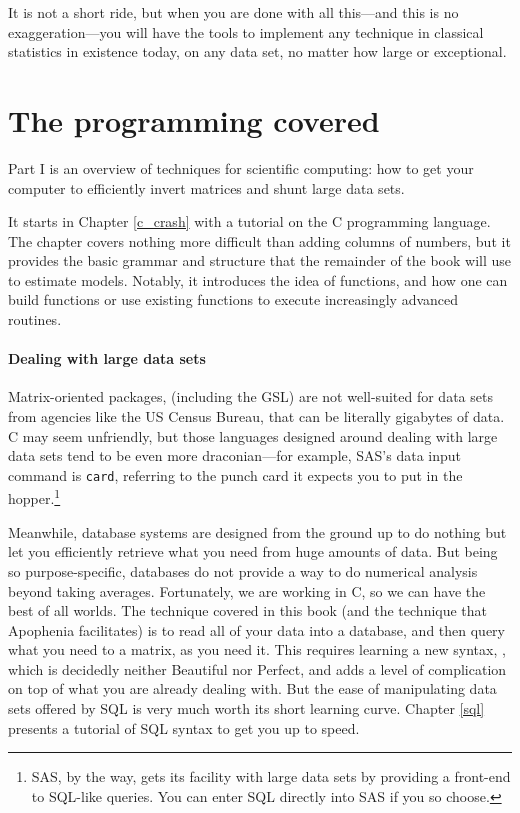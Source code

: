 It is not a short ride, but when you are done with all this---and this
is no exaggeration---you will have the tools to implement any technique
in classical statistics in existence today, on any data set, no matter
how large or exceptional.

\section{The programming covered}

Part I is an overview of techniques for scientific computing: how to get
your computer to efficiently invert matrices and shunt large data sets.

It starts in Chapter \ref{c_crash} with a tutorial on the C programming
language.  The chapter covers nothing more difficult than adding
columns of numbers, but it provides the basic grammar and structure that
the remainder of the book will use to estimate models. Notably,
it introduces the idea of functions, and how one can build functions or
use existing functions to execute increasingly advanced routines.

\paragraph{Dealing with large data sets} Matrix-oriented packages,
(including the GSL) are not well-suited for data sets from agencies like
the US Census Bureau, that can be literally gigabytes of data.
C may seem unfriendly, but
those languages designed around dealing with large data sets tend
to be even more draconian---for example, SAS's data input command
is {\tt card}, referring to the punch card it expects you to put in the
hopper.\footnote{SAS, by the way, gets its facility with large data sets
by providing a front-end to SQL-like queries. You can enter SQL directly into
SAS if you so choose.}

Meanwhile, database systems are designed from the ground up to do nothing
but let you efficiently retrieve what you need from huge amounts of data.
But being so purpose-specific, databases do not provide a way to do
numerical analysis beyond taking averages.  Fortunately, we
are working in C, so we can have the best of all worlds. The technique
covered in this book (and the technique that Apophenia facilitates)
is to read all of your data into a database, and then query what you
need to a matrix, as you need it. This requires learning a new syntax,
, which is decidedly neither Beautiful nor Perfect, and adds a
level of complication on top of what you are already dealing with. But
the ease of manipulating data sets offered by SQL is very much worth
its short learning curve. Chapter \ref{sql} presents a tutorial of SQL
syntax to get you up to speed.

